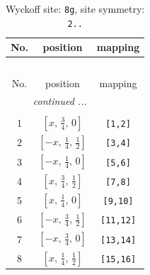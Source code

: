 \documentclass[fleqn,8pt]{jsarticle}
\begin{document}
\renewcommand{\arraystretch}{1.2}
\begin{longtable}{ccc}
\caption{Wyckoff site: {\tt 8g}, site symmetry: {\tt 2..}}
 \\
 \hline \hline
No. & position & mapping \\ \hline \endfirsthead

\multicolumn{2}{l}{\tablename\ \thetable{}} \\
 \hline \hline
No. & position & mapping \\ \hline \endhead

 \hline \hline
\multicolumn{2}{r}{\footnotesize\it continued ...} \\ \endfoot

 \hline \hline
\multicolumn{2}{r}{} \\ \endlastfoot

1 & $\left[ x,\, \frac{3}{4},\, 0 \right]$ & {\tt [1,2]} \\ \hline
2 & $\left[ - x,\, \frac{1}{4},\, \frac{1}{2} \right]$ & {\tt [3,4]} \\ \hline
3 & $\left[ - x,\, \frac{1}{4},\, 0 \right]$ & {\tt [5,6]} \\ \hline
4 & $\left[ x,\, \frac{3}{4},\, \frac{1}{2} \right]$ & {\tt [7,8]} \\ \hline
5 & $\left[ x,\, \frac{1}{4},\, 0 \right]$ & {\tt [9,10]} \\ \hline
6 & $\left[ - x,\, \frac{3}{4},\, \frac{1}{2} \right]$ & {\tt [11,12]} \\ \hline
7 & $\left[ - x,\, \frac{3}{4},\, 0 \right]$ & {\tt [13,14]} \\ \hline
8 & $\left[ x,\, \frac{1}{4},\, \frac{1}{2} \right]$ & {\tt [15,16]} \\
\end{longtable}
\renewcommand{\arraystretch}{1.2}
\end{document}

